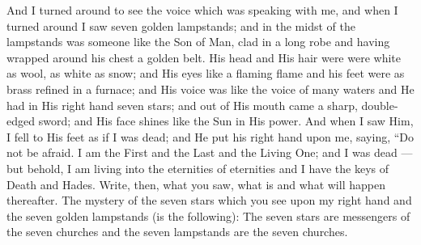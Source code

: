 \begin{pages}
\begin{Rightside}
		\pend
		\pstart
			And I turned around to see the voice which was speaking with me, and when I turned around I saw seven golden lampstands; and in the midst of the lampstands was someone like the Son of Man, clad in a long robe and having wrapped around his chest a golden belt. His head and His hair were were white as wool, as white as snow; and His eyes like a flaming flame and his feet were as brass refined in a furnace; and His voice was like the voice of many waters and He had in His right hand seven stars; and out of His mouth came a sharp, double-edged sword; and His face shines like the Sun in His power.
		\pend
		\pstart
			And when I saw Him, I fell to His feet as if I was dead; and He put his right hand upon me, saying, “Do not be afraid. I am the First and the Last and the Living One; and I was dead — but behold, I am living into the eternities of eternities and I have the keys of Death and Hades. Write, then, what you saw, what is and what will happen thereafter. The mystery of the seven stars which you see upon my right hand and the seven golden lampstands (is the following): The seven stars are messengers of the seven churches and the seven lampstands are the seven churches.
		\pend
        \endnumbering
    \end{Rightside}

\end{pages} 
\Pages